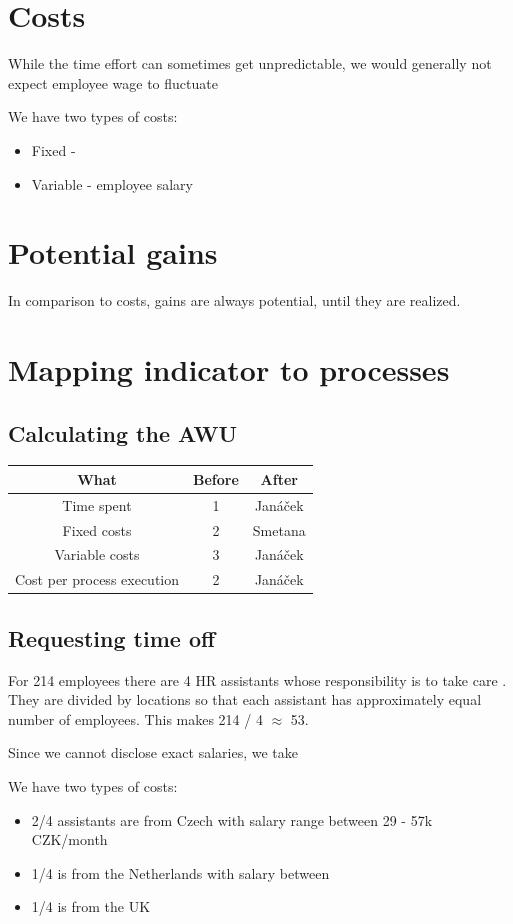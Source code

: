 \documentclass[12pt,oneside]{fithesis2}
\begin{document}
\section*{Costs}
While the time effort can sometimes get unpredictable, we would generally not expect employee wage to fluctuate 

\noindent We have two types of costs:
\begin{itemize}[itemsep=0mm]
    \item Fixed - 
    \item Variable - employee salary
\end{itemize}
\section*{Potential gains}
In comparison to costs, gains are always potential, until they are realized. 


\section{Mapping indicator to processes}
\subsection*{Calculating the AWU}

\begin{center}
\begin{tabular}{ |c|c|c| } 
\hline
What & Before & After \\
\hline
Time spent & 1 & Janáček\\
Fixed costs & 2 & Smetana\\
Variable costs & 3 & Janáček\\
Cost per process execution & 2 & Janáček\\
\hline
\end{tabular}
\end{center}

\subsection*{Requesting time off}

For 214 employees there are 4 HR assistants whose responsibility is to take care . They are divided by locations so that each assistant has approximately equal number of employees. This makes 214 / 4 $\approx$ 53.

Since we cannot disclose exact salaries, we take 

\noindent We have two types of costs:
\begin{itemize}[itemsep=0mm]
    \item 2/4 assistants are from Czech with salary range between 29 - 57k CZK/month
    \item 1/4 is from the Netherlands with salary between 
    \item 1/4 is from the UK
\end{itemize}
\end{document}
